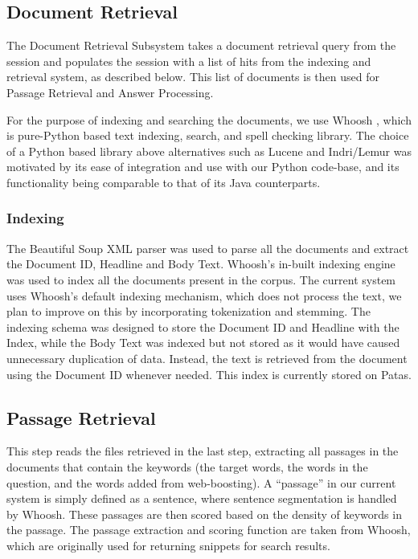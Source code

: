 \documentclass[11pt]{article}
\begin{document}
\subsection{Document Retrieval}
The Document Retrieval Subsystem takes a document retrieval query from the session and populates the session with a list of hits from the indexing and retrieval system, as described below. This list of documents is then used for Passage Retrieval and Answer Processing.

For the purpose of indexing and searching the documents, we use Whoosh \cite{whoosh}, which is pure-Python based text indexing, search, and spell checking library. The choice of a Python based library above alternatives such as Lucene and Indri/Lemur was motivated by its ease of integration and use with our Python code-base, and its functionality being comparable to that of its Java counterparts.

\subsubsection{Indexing}
The Beautiful Soup XML parser \cite{bsoup} was used to parse all the documents and extract the Document ID, Headline and Body Text. Whoosh's in-built indexing engine was used to index all the documents present in the corpus. The current system uses Whoosh's default indexing mechanism, which does not process the text, we plan to improve on this by incorporating tokenization and stemming. The indexing schema was designed to store the Document ID and Headline with the Index, while the Body Text was indexed but not stored as it would have caused unnecessary duplication of data. Instead, the text is retrieved from the document using the Document ID whenever needed. This index is currently stored on Patas.

\subsection{Passage Retrieval}
This step reads the files retrieved in the last step, extracting all passages in the documents that contain the keywords (the target words, the words in the question, and the words added from web-boosting). A ``passage'' in our current system is simply defined as a sentence, where sentence segmentation is handled by Whoosh. These passages are then scored based on the density of keywords in the passage. The passage extraction and scoring function are taken from Whoosh, which are originally used for returning snippets for search results.
\end{document}
